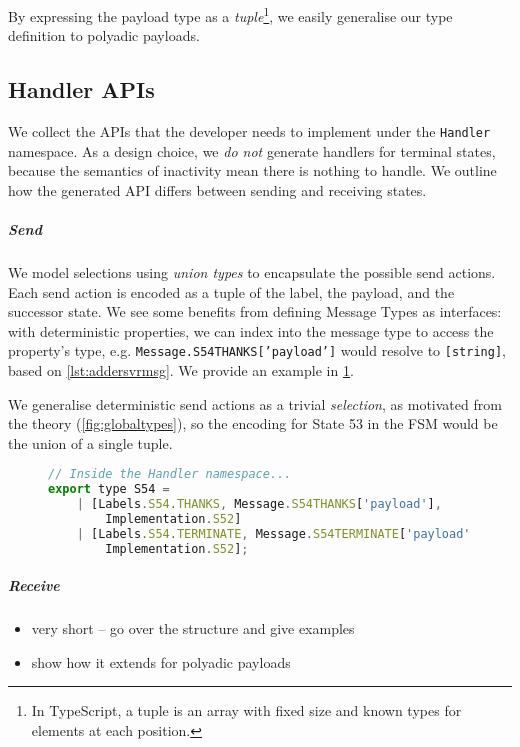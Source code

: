 By expressing the payload type as a \textit{tuple}\footnote{
In TypeScript, a tuple is an array with fixed size
and known types for elements at each position.
},
we easily generalise our type definition to polyadic payloads.

\subsection{Handler APIs}

We collect the APIs that the developer needs to implement
under the \texttt{Handler} namespace. 
As a design choice, we \textit{do not} generate handlers for
terminal states, because the semantics of inactivity mean
there is nothing to handle.
We outline how the generated API differs between sending
and receiving states.

\subparagraph{Send}
We model selections using \textit{union types} to
encapsulate the possible send actions. 
Each send action is encoded as a tuple of
the label, the payload, and the successor state.
We see some benefits from defining Message Types as interfaces:
with deterministic properties, we can index into the message type
to access the property's type, 
e.g. \texttt{Message.S54THANKS['payload']} would resolve to
\texttt{[string]}, based on \cref{lst:addersvrmsg}.
We provide an example in \cref{lst:addersvrsendhandler}.

We generalise deterministic send actions as a trivial \textit{selection}, 
as motivated from the theory (\cref{fig:globaltypes}),
so the encoding for State 53 in the  FSM would be
the union of a single tuple.

\begin{figure}[!ht]
\begin{lstlisting}[language=javascript, tabsize=2]
// Inside the Handler namespace...
export type S54 = 
	| [Labels.S54.THANKS, Message.S54THANKS['payload'],
		Implementation.S52] 
	| [Labels.S54.TERMINATE, Message.S54TERMINATE['payload'], 
		Implementation.S52];
\end{lstlisting}
\label{lst:addersvrsendhandler}
\end{figure}

\subparagraph{Receive}
\begin{itemize}
\item very short -- go over the structure and give examples
\item show how it extends for polyadic payloads
\end{itemize}

